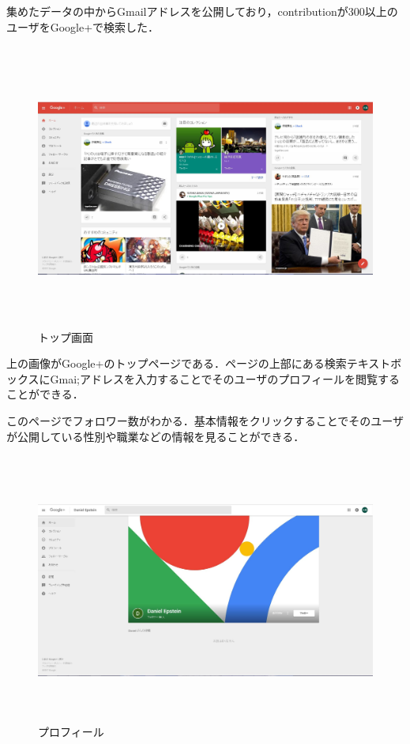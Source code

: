 \newpage

集めたデータの中からGmailアドレスを公開しており，contributionが300以上のユーザをGoogle+で検索した．
  \begin{figure}[htb]
\centering　
\includegraphics[height=8.5cm,width=13cm]{google+.JPG}
\caption{トップ画面}
\end{figure}

上の画像がGoogle+のトップページである．ページの上部にある検索テキストボックスにGmai;アドレスを入力することでそのユーザのプロフィールを閲覧することができる．


\newpage
 
このページでフォロワー数がわかる．基本情報をクリックすることでそのユーザが公開している性別や職業などの情報を見ることができる．

\begin{figure}[htb]
\centering　
\includegraphics[height=8cm,width=13cm]{google+2.JPG}
\caption{プロフィール}
\end{figure}

